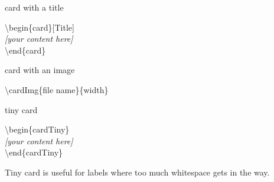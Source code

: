 \documentclass[aspectratio=43]{beamer}
\begin{document}

\begin{frame}{card with a title}
\begin{card}[Title]
\end{card}

\begin{card}
{\color{primary} \textbackslash begin\{card\}[Title]\\[2mm]}
\null\qquad \textit{[your content here]}\\[2mm]
{\color{primary} \textbackslash end\{card\}}
\end{card}
\end{frame}


\begin{frame}{card with an image}
\centering
{}

\begin{card}
{\color{primary} \textbackslash cardImg\{file name\}\{width\}}
\end{card}
\end{frame}


\begin{frame}{tiny card}
\begin{cardTiny}
\end{cardTiny}

\begin{card}
{\color{primary} \textbackslash begin\{cardTiny\}\\[2mm]}
\null\qquad \textit{[your content here]}\\[2mm]
{\color{primary} \textbackslash end\{cardTiny\}}
\end{card}
\begin{card}
Tiny card is useful for labels where too much whitespace gets in the way. 
\end{card}
\end{frame}

\end{document}
